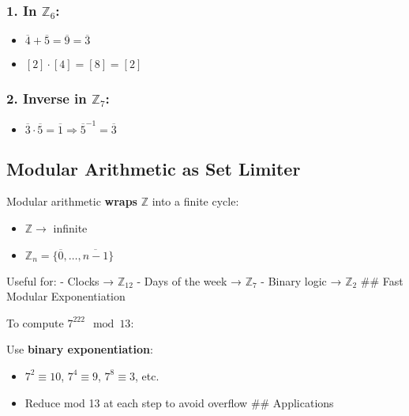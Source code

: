 \documentclass[]{article}
\providecommand{\tightlist}{%
  \setlength{\itemsep}{0pt}\setlength{\parskip}{0pt}}
\begin{document}
\subsubsection{\texorpdfstring{1. In
\(\mathbb{Z}_6\):}{1. In \textbackslash mathbb\{Z\}\_6:}}\label{in-mathbbz_6}

\begin{itemize}
\tightlist
\item
  \(\overline{4} + \overline{5} = \overline{9} = \overline{3}\)
\item
  \([2] \cdot [4] = [8] = [2]\)
\end{itemize}

\subsubsection{\texorpdfstring{2. Inverse in
\(\mathbb{Z}_7\):}{2. Inverse in \textbackslash mathbb\{Z\}\_7:}}\label{inverse-in-mathbbz_7}

\begin{itemize}
\tightlist
\item
  \(\overline{3} \cdot \overline{5} = \overline{1} \Rightarrow \overline{5}^{-1} = \overline{3}\)
\end{itemize}

\subsection{Modular Arithmetic as Set
Limiter}\label{modular-arithmetic-as-set-limiter}

Modular arithmetic \textbf{wraps} \(\mathbb{Z}\) into a finite cycle:

\begin{itemize}
\tightlist
\item
  \(\mathbb{Z} \to\) infinite
\item
  \(\mathbb{Z}_n = \{ \overline{0}, \dots, \overline{n-1} \}\)
\end{itemize}

Useful for: - Clocks → \(\mathbb{Z}_{12}\) - Days of the week →
\(\mathbb{Z}_7\) - Binary logic → \(\mathbb{Z}_2\) \#\# Fast Modular
Exponentiation

To compute \(7^{222} \mod 13\):

Use \textbf{binary exponentiation}:

\begin{itemize}
\tightlist
\item
  \(7^2 \equiv 10\), \(7^4 \equiv 9\), \(7^8 \equiv 3\), etc.
\item
  Reduce mod 13 at each step to avoid overflow \#\# Applications
\end{itemize}
\end{document}
